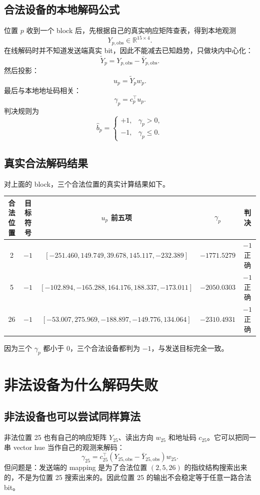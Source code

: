 \documentclass[UTF8,a4paper,11pt]{ctexart}
\begin{document}
\subsection{合法设备的本地解码公式}

位置 $p$ 收到一个 block 后，先根据自己的真实响应矩阵查表，得到本地观测
\[
Y_{p,\mathrm{obs}}\in\mathbb{R}^{15\times4}.
\]
在线解码时并不知道发送端真实 bit，因此不能减去已知趋势，只做块内中心化：
\[
\widetilde{Y}_{p}=Y_{p,\mathrm{obs}}-\bar{Y}_{p,\mathrm{obs}}.
\]
然后投影：
\[
u_p=\widetilde{Y}_pw_p.
\]
最后与本地地址码相关：
\[
\gamma_p=c_p^\top u_p.
\]
判决规则为
\[
\hat b_p=\begin{cases}
+1,&\gamma_p>0,\\
-1,&\gamma_p\le 0.
\end{cases}
\]

\subsection{真实合法解码结果}

对上面的 block，三个合法位置的真实计算结果如下。

\begin{center}
\begin{tabular}{ccccc}
\toprule
合法位置 & 目标符号 & $u_p$ 前五项 & $\gamma_p$ & 判决\\
\midrule
2 & $-1$ & $[-251.460,149.749,39.678,145.117,-232.389]$ & $-1771.5279$ & $-1$ 正确\\
5 & $-1$ & $[-102.894,-165.288,164.176,188.337,-173.011]$ & $-2050.0303$ & $-1$ 正确\\
26 & $-1$ & $[-53.007,275.969,-188.897,-149.776,134.064]$ & $-2310.4931$ & $-1$ 正确\\
\bottomrule
\end{tabular}
\end{center}

因为三个 $\gamma_p$ 都小于 0，三个合法设备都判为 $-1$，与发送目标完全一致。

\section{非法设备为什么解码失败}

\subsection{非法设备也可以尝试同样算法}

非法位置 25 也有自己的响应矩阵 $Y_{25}$、读出方向 $w_{25}$ 和地址码 $c_{25}$。它可以把同一串 vector hue 当作自己的观测来解码：
\[
\gamma_{25}=c_{25}^\top (Y_{25,\mathrm{obs}}-\bar{Y}_{25,\mathrm{obs}})w_{25}.
\]
但问题是：发送端的 mapping 是为了合法位置 $(2,5,26)$ 的指纹结构搜索出来的，不是为位置 25 搜索出来的。因此位置 25 的输出不会稳定等于任意一路合法 bit。
\end{document}
